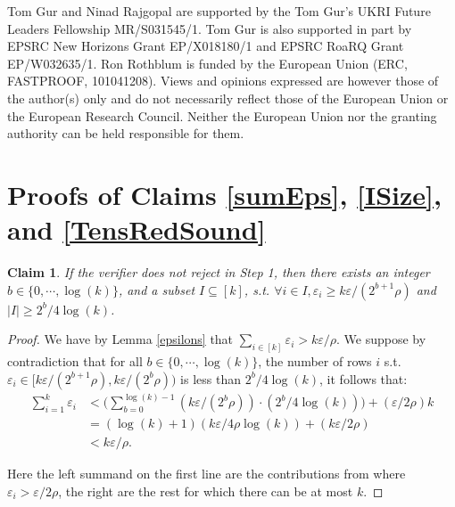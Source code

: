 \documentclass[10pt,a4paper]{article}
\newtheorem{claim}[theorem]{Claim}
\begin{document}
Tom Gur and Ninad Rajgopal are supported by the Tom Gur's UKRI Future Leaders Fellowship MR/S031545/1. Tom Gur is also supported in part by EPSRC New Horizons Grant EP/X018180/1 and EPSRC RoaRQ Grant EP/W032635/1. Ron Rothblum is funded by the European Union (ERC, FASTPROOF, 101041208). Views and opinions expressed are however those of the author(s) only and do not necessarily reflect those of the European Union or the European Research Council. Neither the European Union nor the granting authority can be held responsible for them.



\section{Proofs of Claims \ref{sumEps}, \ref{ISize}, and \ref{TensRedSound}}\label{AppClaimProofs}

\begingroup
\def\thetheorem{\ref{sumEps}}
\begin{claim}
If the verifier does not reject in Step 1, then there exists an integer $b \in \{0,\cdots, \log (k)\}$, and a subset $I \subseteq [k]$, s.t. $\forall i \in I, \varepsilon_{i} \geq k\varepsilon/(2^{b+1}\rho)$ and $\vert I\vert  \geq 2^{b}/4\log (k)$.
\end{claim}
\addtocounter{theorem}{-1}
\endgroup

\begin{proof}
We have by Lemma \ref{epsilons} that $\sum_{i\in [k]}\varepsilon_{i}>k\varepsilon/\rho$. We suppose by contradiction that for all $b\in \{0,\cdots ,\log (k)\}$, the number of rows $i$ s.t. $\varepsilon_{i}\in[k\varepsilon/(2^{b+1}\rho),k\varepsilon /(2^{b}\rho))$ is less than $2^{b}/4\log (k)$, it follows that:
\[
\begin{split}
    \sum_{i=1}^{k}\varepsilon_{i}&<\bigg(\sum_{b=0}^{\log (k) -1}(k\varepsilon/(2^{b}\rho))\cdot (2^{b}/4\log (k))\bigg) +(\varepsilon/2\rho)k\\
    &=(\log (k) +1)(k\varepsilon/4\rho\log (k)) + (k\varepsilon /2\rho)\\
    &<k\varepsilon/\rho.
\end{split}
\]

Here the left summand on the first line are the contributions from where $\varepsilon_{i}>\varepsilon/2\rho$, the right are the rest for which there can be at most $k$.
\end{proof}
\end{document}
